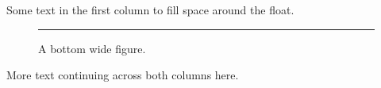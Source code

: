 \documentclass[twocolumn]{article}
\begin{document}
Some text in the first column to fill space around the float.
\begin{figure}[b]
\centering
\rule{10cm}{2cm}
\caption{A bottom wide figure.}
\end{figure}
More text continuing across both columns here.
\end{document}
